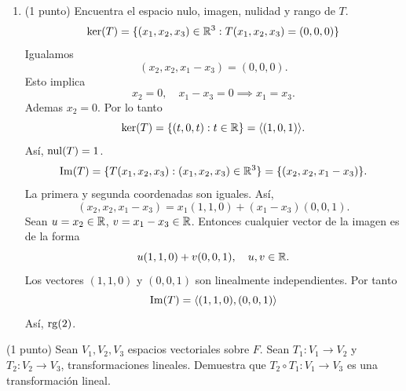 \documentclass[12pt,a4paper]{article}
\begin{document}
\begin{solucion}
\begin{enumerate}
            Por lo tanto
            \begin{equation*}
                T(x_{1},x_{2},x_{3})=(x_{2},x_{2},x_{1}-x_{3}).
            \end{equation*}
            \item[(b)] (1 punto) Encuentra el espacio nulo, imagen, nulidad y rango de $T$.
            \begin{equation*}
                \ker(T)=\{(x_{1},x_{2},x_{3})\in\mathbb{R}^{3}:T(x_{1},x_{2},x_{3})=(0,0,0)\}
            \end{equation*}
            Igualamos
            \begin{equation*}
                (x_{2},x_{2},x_{1}-x_{3})=(0,0,0).
            \end{equation*}
            Esto implica
            \begin{equation*}
                x_{2}=0,\quad x_{1}-x_{3}=0\implies x_{1}=x_{3}.
            \end{equation*}
            Ademas $x_{2}=0$. Por lo tanto
            \begin{equation*}
                \ker(T)=\{(t,0,t):t\in\mathbb{R}\}=\langle (1,0,1) \rangle.
            \end{equation*}
            Así, $\operatorname{nul}(T)=1$.
            \begin{equation*}
                \Im(T)=\{T(x_{1},x_{2},x_{3}):(x_{1},x_{2},x_{3})\in\mathbb{R}^{3}\}=\{(x_{2},x_{2},x_{1}-x_{3})\}.
            \end{equation*}
            La primera y segunda coordenadas son iguales. Así,
            \begin{equation*}
                (x_{2},x_{2},x_{1}-x_{3})=x_{1}(1,1,0)+(x_{1}-x_{3})(0,0,1).
            \end{equation*}
            Sean $u=x_{2}\in\mathbb{R}$, $v=x_{1}-x_{3}\in\mathbb{R}$. Entonces cualquier vector de la imagen es de la forma
            \begin{equation*}
                u(1,1,0)+v(0,0,1),\quad u,v\in\mathbb{R}.
            \end{equation*}
            Los vectores $(1,1,0)$ y $(0,0,1)$ son linealmente independientes. Por tanto
            \begin{equation*}
                \Im(T)=\langle (1,1,0),(0,0,1) \rangle
            \end{equation*}
            Así, $\operatorname{rg}(2)$.
        \end{enumerate}
    \end{solucion} 

    \begin{mdframed}[style=mdpinkbox,frametitle={Ejercicio 4}]
        (1 punto) Sean $V_{1},V_{2},V_{3}$ espacios vectoriales sobre $F$. Sean $T_{1}:V_{1}\to V_{2}$
        y $T_{2}:V_{2}\to V_{3}$, transformaciones lineales. Demuestra que $T_{2}\circ T_{1}:V_{1}\to V_{3}$
        es una transformación lineal.
    \end{mdframed}
\end{document}
